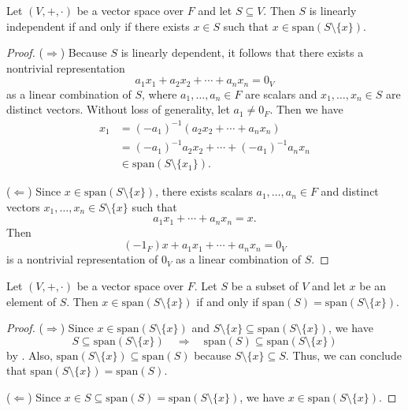 \begin{theorem}\label{thm:linear-dependence-first-equivalence}
  Let $(V, +, \cdot)$ be a vector space over $F$ and let $S \subseteq V$.
  Then $S$ is linearly independent if and only if there exists $x \in S$
  such that $x \in \mathrm{span}(S \setminus \{x\})$.
\end{theorem}
\begin{proof}
  ($\Rightarrow$) Because $S$ is linearly dependent, it follows that
  there exists a nontrivial representation
  \begin{equation*}
    a_1x_1 + a_2x_2 + \cdots + a_nx_n = 0_V
  \end{equation*}
  as a linear combination of $S$, where $a_1, \dots, a_n \in F$ are scalars
  and $x_1, \dots, x_n \in S$ are distinct vectors.
  Without loss of generality, let $a_1 \neq 0_F$.
  Then we have
  \begin{align*}
    x_1
    &= (-a_1)^{-1}(a_2x_2 + \cdots + a_nx_n) \\
    &= (-a_1)^{-1}a_2x_2 + \cdots + (-a_1)^{-1}a_nx_n \\
    &\in \mathrm{span}(S \setminus \{x_1\}).
  \end{align*}
  
  ($\Leftarrow$) Since $x \in \mathrm{span}(S \setminus \{x\})$, there exists
  scalars $a_1, \dots, a_n \in F$ and distinct vectors
  $x_1, \dots, x_n \in S \setminus \{x\}$ such that
  \begin{equation*}
    a_1x_1 + \cdots + a_nx_n = x.
  \end{equation*}
  Then
  \begin{equation*}
    (-1_F)x + a_1x_1 + \cdots + a_nx_n = 0_V
  \end{equation*}
  is a nontrivial representation of $0_V$ as a linear combination of $S$.
\end{proof}

\begin{theorem}\label{thm:linear-dependence-second-equivalence}
  Let $(V, +, \cdot)$ be a vector space over $F$.
  Let $S$ be a subset of $V$ and let $x$ be an element of $S$.
  Then $x \in \mathrm{span}(S \setminus \{x\})$ if and only if
  $\mathrm{span}(S) = \mathrm{span}(S \setminus \{x\})$.
\end{theorem}
\begin{proof}
  ($\Rightarrow$) Since $x \in \mathrm{span}(S \setminus \{x\})$
  and $S \setminus \{x\} \subseteq \mathrm{span}(S \setminus \{x\})$,
  we have
  \begin{equation*}
    S \subseteq \mathrm{span}(S \setminus \{x\})
    \quad \Rightarrow \quad
    \mathrm{span}(S) \subseteq \mathrm{span}(S \setminus \{x\})
  \end{equation*}
  by
  .
  Also, $\mathrm{span}(S \setminus \{x\}) \subseteq \mathrm{span}(S)$
  because $S \setminus \{x\} \subseteq S$.
  Thus, we can conclude that
  $\mathrm{span}(S \setminus \{x\}) = \mathrm{span}(S)$.

  ($\Leftarrow$) Since
  $x \in S \subseteq \mathrm{span}(S) = \mathrm{span}(S \setminus \{x\})$,
  we have $x \in \mathrm{span}(S \setminus \{x\})$.
\end{proof}

